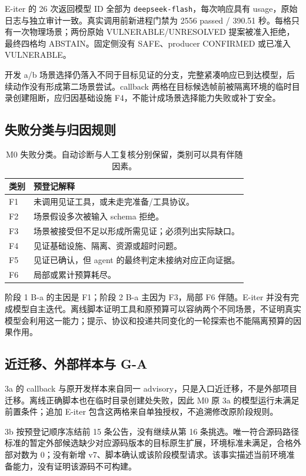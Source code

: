 \documentclass[UTF8,a4paper,zihao=-4,fontset=none]{ctexart}
\newcommand{\code}[1]{{\small\nolinkurl{#1}}}
\begin{document}
E-iter 的 26 次返回模型 ID 全部为 \code{deepseek-flash}，每次响应具有 usage，原始日志与独立审计一致。真实调用前新进程门禁为 2556 passed / 390.51 秒。每格只有一次物理场景；两份原始 VULNERABLE/UNRESOLVED 提案被准入拒绝，最终四格均 ABSTAIN。固定侧没有 SAFE、producer CONFIRMED 或已准入 VULNERABLE。\cite{eiter}

开发 a/b 场景选择仍落入不同于目标见证的分支，完整紧凑响应已到达模型，后续动作没有形成第二场景尝试。callback 两格在目标候选帧前被隔离环境的临时目录创建阻断，应归因基础设施 F4，不能计成场景选择能力失败或补丁安全。

\subsection{失败分类与归因规则}
\begin{table}[htbp]
\centering\small
\begin{tabularx}{\textwidth}{L{11mm}Y}
\toprule 类别 & 预登记解释\\\midrule
F1 & 未调用见证工具，或未走完准备/工具协议。\\
F2 & 场景假设多次被输入 schema 拒绝。\\
F3 & 场景被接受但不足以形成所需见证；必须列出实际缺口。\\
F4 & 见证基础设施、隔离、资源或超时问题。\\
F5 & 见证已确认，但 agent 的最终判定未接纳对应正向证据。\\
F6 & 局部或累计预算耗尽。\\
\bottomrule
\end{tabularx}
\caption{M0 失败分类。自动诊断与人工复核分别保留，类别可以具有伴随因素。}
\end{table}

阶段 1 B-a 的主因是 F1；阶段 2 B-a 主因为 F3，局部 F6 伴随。E-iter 并没有完成模型自主迭代。离线脚本证明工具和原预算可以容纳两个不同场景，不证明真实模型会利用这一能力；提示、协议和投递共同变化的一轮探索也不能隔离预算的因果作用。

\subsection{近迁移、外部样本与 G-A}
3a 的 callback 与原开发样本来自同一 advisory，只是入口近迁移，不是外部项目迁移。离线正确脚本也在临时目录创建处失败，因此 M0 原 3a 的模型运行未满足前置条件；追加 E-iter 包含这两格来自单独授权，不追溯修改原阶段规则。

3b 按预登记顺序冻结前 15 条公告，没有继续从第 16 条挑选。唯一符合源码路径标准的暂定外部候选缺少对应源码版本的目标原生扩展，环境标准未满足，合格外部对数为 0；没有新增 v7、脚本确认或该阶段模型请求。该事实描述当前环境准备能力，没有证明该源码不可构建。
\end{document}
